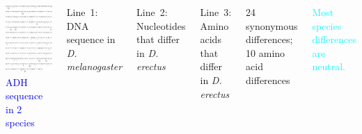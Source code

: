 \documentclass[handout]{beamer}
\begin{document}
\begin{frame}
\begin{columns}
\medskip

\includegraphics[height=0.9\textheight]{adhseq-2sp.png}\\
\textcolor{blue}{{\large ADH sequence in 2 species}}

\bigskip

Line~1: DNA sequence in \emph{D. melanogaster}

\bigskip

Line~2: Nucleotides that differ in \emph{D. erectus}

\bigskip

Line~3: Amino acids that differ in \emph{D. erectus}

\bigskip

24 synonymous differences; 10 amino acid differences

\bigskip

\textcolor{cyan}{Most species differences are neutral.}
\end{columns}
\end{frame}
\end{document}
